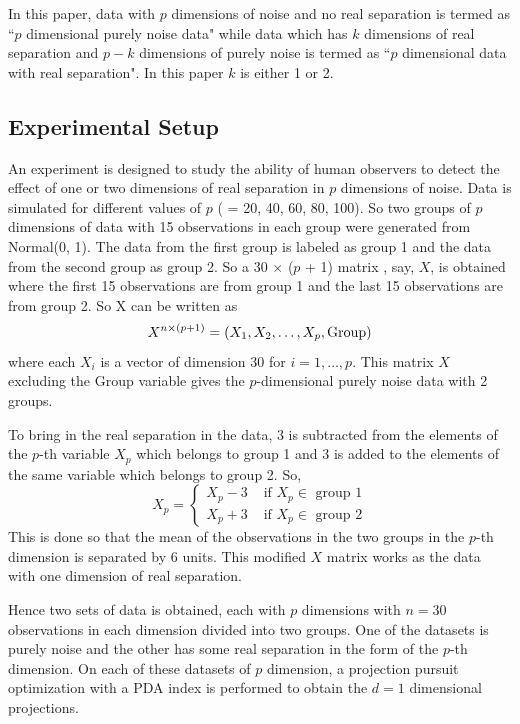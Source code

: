 \documentclass[12]{article}
\newcommand{\blue}{\color{blue}}
\begin{document}

In this paper, data with $p$ dimensions of noise and no real separation is termed as ``$p$ dimensional purely noise data" while data which has $k$ dimensions of real separation and $p - k$ dimensions of purely noise is termed as ``$p$ dimensional data with real separation". In this paper $k$ is either 1 or 2. 

\subsection{Experimental Setup} \label{sec:experiment}


An experiment is designed to study the ability of human observers to detect the effect of one or two dimensions of real separation in $p$ dimensions of noise. Data is simulated for different values of $p$  ( = 20, 40, 60, 80, 100).  So two groups of $p$ dimensions of data with 15 observations in each group were generated from Normal(0, 1).  The data from the first group is labeled as group 1 and the data from the second group as group 2. So a 30 $\times$ ($p$ + 1) matrix , say, $X$, is obtained where the first 15 observations are from group 1 and the last 15 observations are from group 2.  So X can be written as
$$X^{n \times (p + 1)} = (X_1, X_2, \dots, X_p, \hbox{Group})$$ where each $X_i$ is a vector of dimension 30 for $i = 1, \dots, p$. This matrix $X$ excluding the Group variable gives the $p$-dimensional purely noise data with 2 groups.

To bring in the real separation in the data, 3 is subtracted from the elements of the $p$-th variable $X_p$ which belongs to group 1 and 3 is added to the elements of the same variable which belongs to group 2. So, 
$$
X_p = \left\{ \begin{array}{rl}
 X_p - 3 &\mbox{ if $X_p \in$ group 1} \\
 X_p + 3 &\mbox{ if $X_p \in$ group 2}
       \end{array} \right.
$$
This is done so that the mean of the observations in the two groups in the $p$-th dimension is separated by 6 units. This modified $X$ matrix works as the data with one dimension of real separation. 

Hence two sets of data is obtained, each with $p$ dimensions with $n = 30$ observations in each dimension divided into two groups. One of the datasets is purely noise and the other has some real separation in the form of the $p$-th dimension. On each of these datasets of $p$ dimension, a projection pursuit optimization with a PDA index is performed to obtain the $d = 1$ dimensional projections.  
\end{document}
